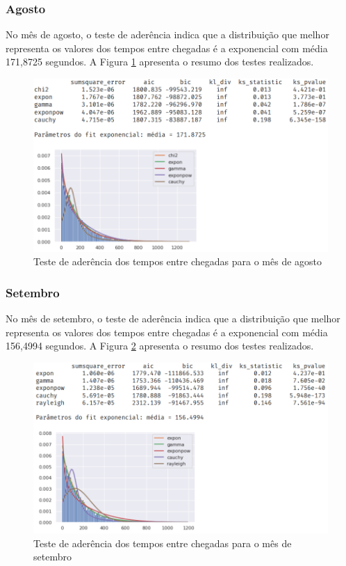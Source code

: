 \subsubsection*{Agosto}
No mês de agosto, o teste de aderência indica que a distribuição que melhor representa os valores dos tempos entre chegadas é a exponencial com média 171,8725 segundos. A Figura \ref*{fig: fit-agosto} apresenta o resumo dos testes realizados.

\begin{figure}[H]
    \includegraphics[scale=0.8]{analise-de-dados/fit/fit-agosto.png}
    \caption{Teste de aderência dos tempos entre chegadas para o mês de agosto}
    \label{fig: fit-agosto}
\end{figure}

\subsubsection*{Setembro}
No mês de setembro, o teste de aderência indica que a distribuição que melhor representa os valores dos tempos entre chegadas é a exponencial com média 156,4994 segundos. A Figura \ref*{fig: fit-setembro} apresenta o resumo dos testes realizados.

\begin{figure}[H]
    \includegraphics[scale=0.8]{analise-de-dados/fit/fit-setembro.png}
    \caption{Teste de aderência dos tempos entre chegadas para o mês de setembro}
    \label{fig: fit-setembro}
\end{figure}

